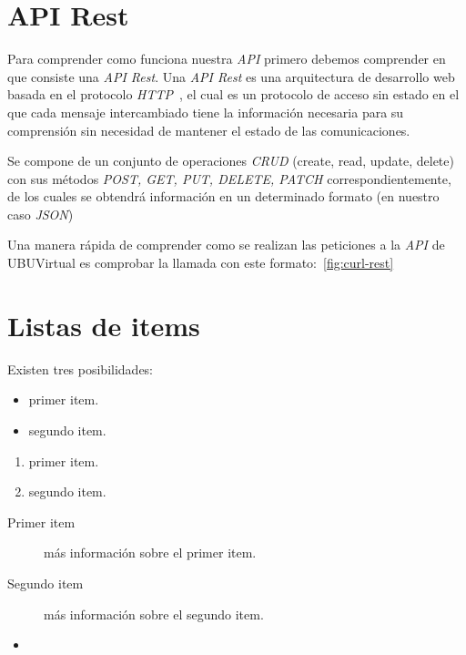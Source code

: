 
\section{API Rest}\label{sec:api-rest}
Para comprender como funciona nuestra \textit{API} primero debemos comprender en que consiste una \textit{API Rest}. Una \textit{API Rest} es una arquitectura de desarrollo web basada en el protocolo \textit{HTTP}~\cite{wiki:http}, el cual es un protocolo de acceso sin estado en el que cada mensaje intercambiado tiene la información necesaria para su comprensión sin necesidad de mantener el estado de las comunicaciones.

Se compone de un conjunto de operaciones \textit{CRUD} (create, read, update, delete) con sus métodos \textit{POST, GET, PUT, DELETE, PATCH} correspondientemente, de los cuales se obtendrá información en un determinado formato (en nuestro caso \textit{JSON})

Una manera rápida de comprender como se realizan las peticiones a la \textit{API} de UBUVirtual es comprobar la llamada con este formato:~\ref{fig:curl-rest}
~\cite{moodle:api-rest-config}



\section{Listas de items}

Existen tres posibilidades:

\begin{itemize}
	\item primer item.
	\item segundo item.
\end{itemize}

\begin{enumerate}
	\item primer item.
	\item segundo item.
\end{enumerate}

\begin{description}
	\item[Primer item] más información sobre el primer item.
	\item[Segundo item] más información sobre el segundo item.
\end{description}
	
\begin{itemize}
\item 
\end{itemize}

